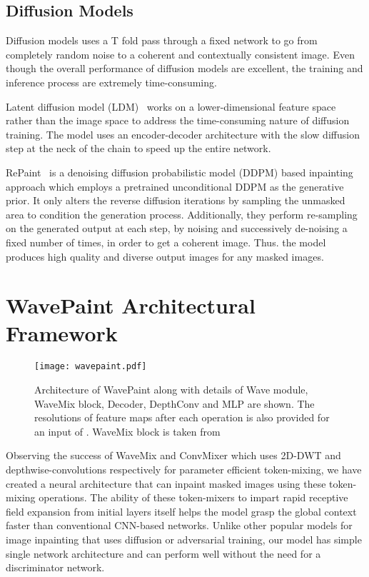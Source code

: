 \documentclass{article}
\begin{document}
\subsection{Diffusion Models}

Diffusion models uses a T fold pass through a fixed network to go from completely random noise to a coherent and contextually consistent image. Even though the overall performance of diffusion models are excellent, the training and inference process are extremely time-consuming. 

Latent diffusion model (LDM)~\cite{rombach2021highresolution} works on a lower-dimensional feature space rather than the image space to address the time-consuming nature of diffusion training. The model uses an encoder-decoder architecture with the slow diffusion step at the neck of the chain to speed up the entire network. 

RePaint~\cite{lugmayr2022repaint} is a denoising diffusion probabilistic model (DDPM) based inpainting approach which employs a pretrained unconditional DDPM as the generative prior. It only alters the reverse diffusion iterations by sampling the unmasked area to condition the generation process. Additionally, they perform re-sampling on the generated output at each step, by noising and successively de-noising a fixed number of times, in order to get a coherent image. Thus. the model produces high quality and diverse output images for any masked images.



\section{WavePaint Architectural Framework}
\label{sec:3}

\begin{figure*}[t]
\centering
\texttt{[image: wavepaint.pdf]}
\caption{Architecture of WavePaint along with details of Wave module, WaveMix block, Decoder, DepthConv and MLP are shown. The resolutions of feature maps after each operation is also provided for an input of . WaveMix block is taken from~\cite{jeevan2023wavemix}}
\label{fig:wavepaint}
\end{figure*}

Observing the success of WaveMix and ConvMixer which uses 2D-DWT and depthwise-convolutions respectively for parameter efficient token-mixing, we have created a neural architecture that can inpaint masked images using these token-mixing operations. The ability of these token-mixers to impart rapid receptive field expansion from initial layers itself helps the model grasp the global context faster than conventional CNN-based networks. 
Unlike other popular models for image inpainting that uses diffusion or adversarial training, our model has simple single network architecture and can perform well without the need for a discriminator network.
\end{document}
